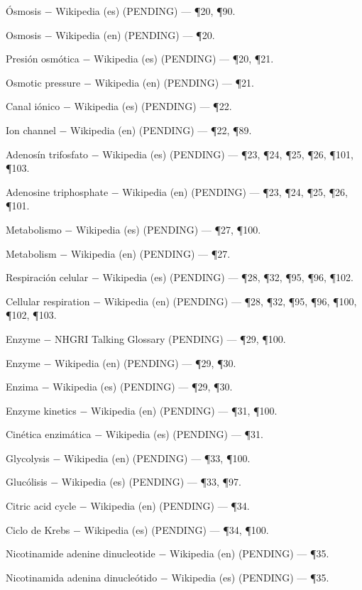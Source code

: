 \documentclass{book}
\begin{document}
\noindent Ósmosis \(-\) Wikipedia (es) (PENDING) --- \P20, \P90.

\noindent Osmosis \(-\) Wikipedia (en) (PENDING) --- \P20.

\noindent Presión osmótica \(-\) Wikipedia (es) (PENDING) --- \P20, \P21.

\noindent Osmotic pressure \(-\) Wikipedia (en) (PENDING) --- \P21.

\noindent Canal iónico \(-\) Wikipedia (es) (PENDING) --- \P22.

\noindent Ion channel \(-\) Wikipedia (en) (PENDING) --- \P22, \P89.

\noindent Adenosín trifosfato \(-\) Wikipedia (es) (PENDING) --- \P23, \P24, \P25, \P26, \P101, \P103.

\noindent Adenosine triphosphate \(-\) Wikipedia (en) (PENDING) --- \P23, \P24, \P25, \P26, \P101.

\noindent Metabolismo \(-\) Wikipedia (es) (PENDING) --- \P27, \P100.

\noindent Metabolism \(-\) Wikipedia (en) (PENDING) --- \P27.

\noindent Respiración celular \(-\) Wikipedia (es) (PENDING) --- \P28, \P32, \P95, \P96, \P102.

\noindent Cellular respiration \(-\) Wikipedia (en) (PENDING) --- \P28, \P32, \P95, \P96, \P100, \P102, \P103.

\noindent Enzyme \(-\) NHGRI Talking Glossary (PENDING) --- \P29, \P100.

\noindent Enzyme \(-\) Wikipedia (en) (PENDING) --- \P29, \P30.

\noindent Enzima \(-\) Wikipedia (es) (PENDING) --- \P29, \P30.

\noindent Enzyme kinetics \(-\) Wikipedia (en) (PENDING) --- \P31, \P100.

\noindent Cinética enzimática \(-\) Wikipedia (es) (PENDING) --- \P31.

\noindent Glycolysis \(-\) Wikipedia (en) (PENDING) --- \P33, \P100.

\noindent Glucólisis \(-\) Wikipedia (es) (PENDING) --- \P33, \P97.

\noindent Citric acid cycle \(-\) Wikipedia (en) (PENDING) --- \P34.

\noindent Ciclo de Krebs \(-\) Wikipedia (es) (PENDING) --- \P34, \P100.

\noindent Nicotinamide adenine dinucleotide \(-\) Wikipedia (en) (PENDING) --- \P35.

\noindent Nicotinamida adenina dinucleótido \(-\) Wikipedia (es) (PENDING) --- \P35.
\end{document}
